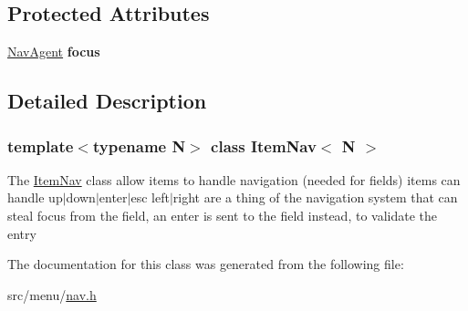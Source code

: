 \subsection*{Protected Attributes}
\begin{DoxyCompactItemize}
\item 
\mbox{\label{classItemNav_a6b58882d926efce27e342fac54fe853a}} 
\hyperlink{structNavAgent}{Nav\+Agent} {\bfseries focus}
\end{DoxyCompactItemize}


\subsection{Detailed Description}
\subsubsection*{template$<$typename N$>$\newline
class Item\+Nav$<$ N $>$}

The \hyperlink{classItemNav}{Item\+Nav} class allow items to handle navigation (needed for fields) items can handle up$\vert$down$\vert$enter$\vert$esc left$\vert$right are a thing of the navigation system that can steal focus from the field, an enter is sent to the field instead, to validate the entry 

The documentation for this class was generated from the following file\+:\begin{DoxyCompactItemize}
\item 
src/menu/\hyperlink{nav_8h}{nav.\+h}\end{DoxyCompactItemize}
